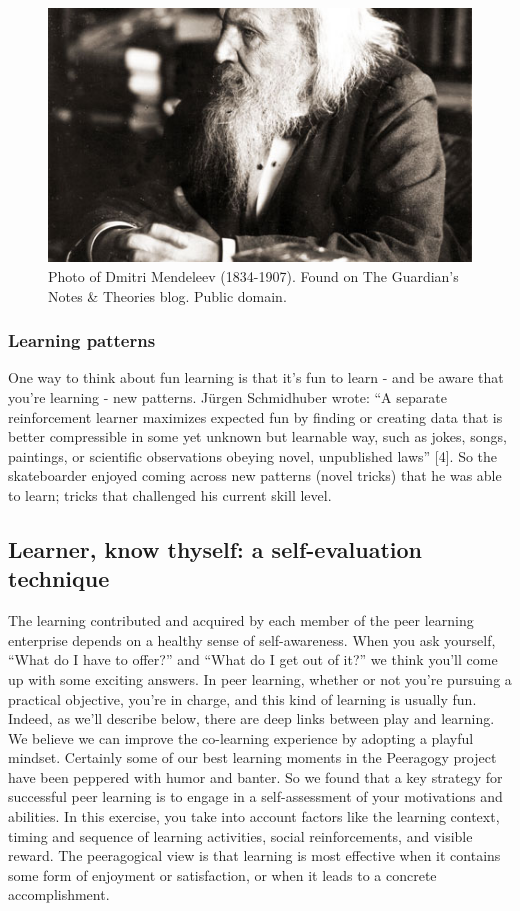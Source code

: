 \begin{figure}
\begin{center}
\includegraphics[width=.8\textwidth]{../pictures/mendeleev.jpg}
\end{center}
\caption*{Photo of Dmitri Mendeleev (1834-1907). Found on The Guardian's Notes \&
Theories blog. Public domain.}
\end{figure}

\subsubsection{Learning patterns}

One way to think about fun learning is that it's fun to learn - and be
aware that you're learning - new patterns. Jürgen Schmidhuber wrote: ``A
separate reinforcement learner maximizes expected fun by finding or
creating data that is better compressible in some yet unknown but
learnable way, such as jokes, songs, paintings, or scientific
observations obeying novel, unpublished laws'' {[}4{]}. So the
skateboarder enjoyed coming across new patterns (novel tricks) that he
was able to learn; tricks that challenged his current skill level.

\subsection{Learner, know thyself: a self-evaluation technique}

The learning contributed and acquired by each member of the peer
learning enterprise depends on a healthy sense of self-awareness. When
you ask yourself, ``What do I have to offer?'' and ``What do I get out
of it?'' we think you'll come up with some exciting answers. In peer
learning, whether or not you're pursuing a practical objective, you're
in charge, and this kind of learning is usually fun. Indeed, as we'll
describe below, there are deep links between play and learning. We
believe we can improve the co-learning experience by adopting a playful
mindset. Certainly some of our best learning moments in the Peeragogy
project have been peppered with humor and banter. So we found that a key
strategy for successful peer learning is to engage in a self-assessment
of your motivations and abilities. In this exercise, you take into
account factors like the learning context, timing and sequence of
learning activities, social reinforcements, and visible reward. The
peeragogical view is that learning is most effective when it contains
some form of enjoyment or satisfaction, or when it leads to a concrete
accomplishment.


